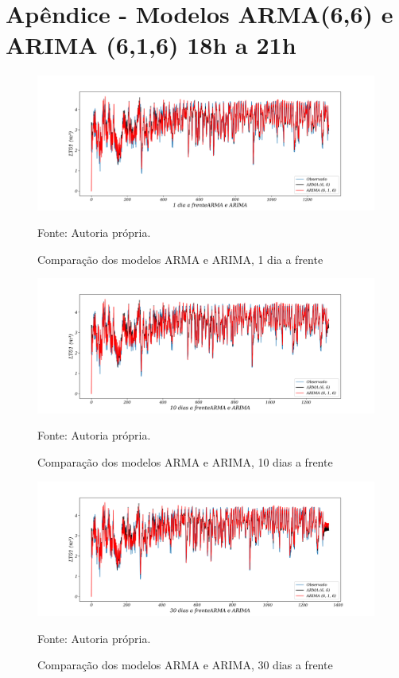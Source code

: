 
\section{Apêndice - Modelos ARMA(6,6) e ARIMA (6,1,6) 18h a 21h}\label{sec:armarima18}

\begin{figure}[H]
	\centering
	\caption{Comparação dos modelos ARMA e ARIMA, 1 dia a frente }
	\label{fig:1-ARMA-ARIMA}
	\includegraphics[width=1\linewidth]{Apendices/Figuras/modelagem-18-a-21h/1-ARMA-ARIMA}
	
	Fonte: Autoria própria.
\end{figure}

\begin{figure}[H]
	\centering
	\caption{Comparação dos modelos ARMA e ARIMA, 10 dias a frente }
	\label{fig:10-ARMA-ARIMA}
	\includegraphics[width=1\linewidth]{Apendices/Figuras/modelagem-18-a-21h/10-ARMA-ARIMA}
	
	Fonte: Autoria própria.
\end{figure}


\begin{figure}[H]
	\centering
	\caption{Comparação dos modelos ARMA e ARIMA, 30 dias a frente }
	\label{fig:30-ARMA-ARIMA}
	\includegraphics[width=1\linewidth]{Apendices/Figuras/modelagem-18-a-21h/30-ARMA-ARIMA}
	
	Fonte: Autoria própria.
\end{figure}

